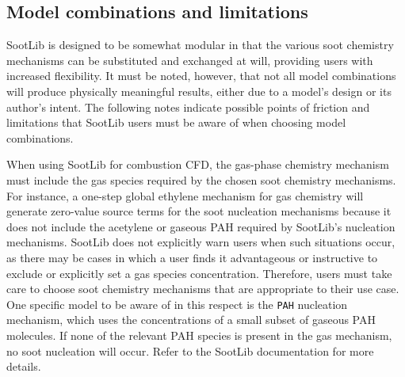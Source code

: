 \documentclass[preprint,letterpaper]{elsarticle}
\begin{document}
\subsection{Model combinations and limitations}
\label{ss:limitations}

SootLib is designed to be somewhat modular in that the various soot chemistry mechanisms can be substituted and exchanged at will, providing users with increased flexibility. It must be noted, however, that not all model combinations will produce physically meaningful results, either due to a model's design or its author's intent. The following notes indicate possible points of friction and limitations that SootLib users must be aware of when choosing model combinations.

When using SootLib for combustion CFD, the gas-phase chemistry mechanism must include the gas species required by the chosen soot chemistry mechanisms. For instance, a one-step global ethylene mechanism for gas chemistry will generate zero-value source terms for the soot nucleation mechanisms because it does not include the acetylene or gaseous PAH required by SootLib's nucleation mechanisms. SootLib does not explicitly warn users when such situations occur, as there may be cases in which a user finds it advantageous or instructive to exclude or explicitly set a gas species concentration. Therefore, users must take care to choose soot chemistry mechanisms that are appropriate to their use case. One specific model to be aware of in this respect is the \texttt{PAH} nucleation mechanism, which uses the concentrations of a small subset of gaseous PAH molecules. If none of the relevant PAH species is present in the gas mechanism, no soot nucleation will occur. Refer to the SootLib documentation for more details.
\end{document}
